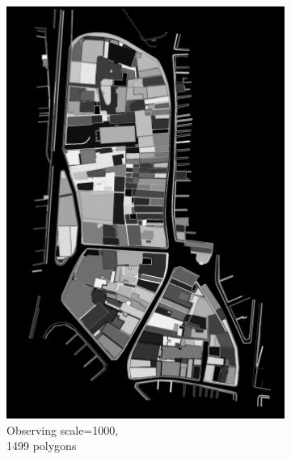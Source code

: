 \documentclass[12pt]{article}
\begin{document}
\begin{figure}[H]
\begin{subfigure}[b]{.3\textwidth}
		\includegraphics[width=1\linewidth]{images/polygon_recovery/felzenswalb1_scale1000_region1499.png}  
	   	\caption{Observing scale=1000, \\ 1499 polygons}
	\end{subfigure}
	\begin{subfigure}[b]{.3\textwidth}
		\centering

\end{subfigure}
\end{figure}
\end{document}
